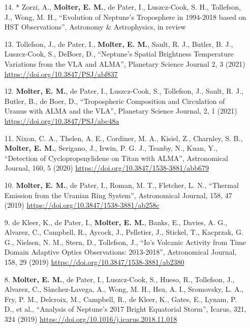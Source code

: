 \documentclass[margin, 10pt]{res} %
\begin{document}
\begin{resume}
{\begin{enumerate}
\item[14.]* Zorzi, A., {\bf Molter, E. M.}, de Pater, I., Luszcz-Cook, S. H., Tollefson, J., Wong, M. H., ``Evolution of Neptune's Troposphere in 1994-2018 based on HST Observations'', Astronomy \& Astrophysics, in review 

\item[13.] Tollefson, J., de Pater, I., {\bf Molter, E. M.}, Sault, R. J., Butler, B. J., Luszcz-Cook, S., DeBoer, D., ``Neptune's Spatial Brightness Temperature Variations from the VLA and ALMA'', Planetary Science Journal 2, 3 (2021) \url{https://doi.org/10.3847/PSJ/abf837}

\item[12.] {\bf Molter, E. M.}, de Pater, I., Luszcz-Cook, S., Tollefson, J., Sault, R. J., Butler, B., de Boer, D., ``Tropospheric Composition and Circulation of Uranus with ALMA and the VLA'', Planetary Science Journal, 2, 1 (2021) \url{https://doi.org/10.3847/PSJ/abc48a}

\item[11.] Nixon, C. A., Thelen, A. E., Cordiner, M. A., Kisiel, Z., Charnley, S. B., {\bf Molter, E. M.}, Serigano, J., Irwin, P. G. J., Teanby, N., Kuan, Y., ``Detection of Cyclopropenylidene on Titan with ALMA'', Astronomical Journal, 160, 5 (2020) \url{https://doi.org/10.3847/1538-3881/abb679}

\item[10.] {\bf Molter, E. M.}, de Pater, I., Roman, M. T., Fletcher, L. N., ``Thermal Emission from the Uranian Ring System'', Astronomical Journal, 158, 47 (2019) \url{https://doi.org/10.3847/1538-3881/ab258c}

\item[9.] de Kleer, K., de Pater, I., {\bf Molter, E. M.}, Banks, E., Davies, A. G., Alvarez, C., Campbell, R., Aycock, J., Pelletier, J., Stickel, T., Kacprzak, G. G., Nielsen, N. M., Stern, D., Tollefson, J., ``Io's Volcanic Activity from Time Domain Adaptive Optics Observations: 2013-2018'', Astronomical Journal, 158, 29 (2019) \url{https://doi.org/10.3847/1538-3881/ab2380}

\item[8.] {\bf Molter, E. M.}, de Pater, I., Luszcz-Cook, S., Hueso, R., Tollefson, J., Alvarez, C., S\`anchez-Lavega, A., Wong, M. H., Hsu, A. I., Sromovsky, L. A., Fry, P. M., Delcroix, M., Campbell, R., de Kleer, K., Gates, E., Lynam, P. D., et al., ``Analysis of Neptune's 2017 Bright Equatorial Storm'', Icarus, 321, 324 (2019) \url{https://doi.org/10.1016/j.icarus.2018.11.018}


\end{enumerate}}
\end{resume}
\end{document}
